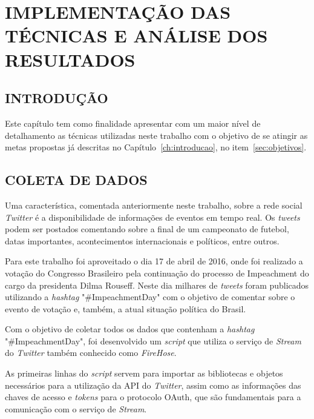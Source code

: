 \chapter{IMPLEMENTAÇÃO DAS TÉCNICAS E ANÁLISE DOS RESULTADOS}\label{ch:implementacao}

\section{INTRODUÇÃO}
Este capítulo tem como finalidade apresentar com um maior nível de detalhamento as técnicas utilizadas neste trabalho com o objetivo de se atingir as metas propostas já descritas no Capítulo~\ref{ch:introducao}, no item~\ref{sec:objetivos}.

\section{COLETA DE DADOS}
Uma característica, comentada anteriormente neste trabalho, sobre a rede social \textit{Twitter} é a disponibilidade de informações de eventos em tempo real. Os \textit{tweets} podem ser postados comentando sobre a final de um campeonato de futebol, datas importantes, acontecimentos internacionais e políticos, entre outros.

Para este trabalho foi aproveitado o dia 17 de abril de 2016, onde foi realizado a votação do Congresso Brasileiro pela continuação do processo de Impeachment do cargo da presidenta Dilma Rouseff. Neste dia milhares de \textit{tweets} foram publicados utilizando a \textit{hashtag} "\#ImpeachmentDay" \space com o objetivo de comentar sobre o evento de votação e, também, a atual situação política do Brasil.

Com o objetivo de coletar todos os dados que contenham a \textit{hashtag} "\#ImpeachmentDay", foi desenvolvido um \textit{script} que utiliza o serviço de \textit{Stream} do \textit{Twitter} também conhecido como \textit{FireHose}.

As primeiras linhas do \textit{script} servem para importar as bibliotecas e objetos necessários para a utilização da API do \textit{Twitter}, assim como as informações das chaves de acesso e \textit{tokens} para o protocolo OAuth, que são fundamentais para a comunicação com o serviço de \textit{Stream}. \\



